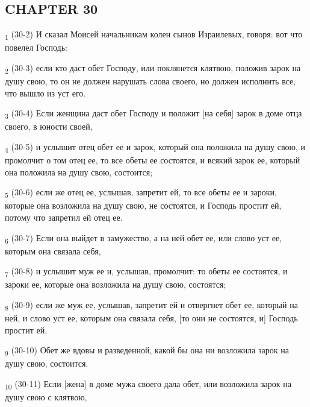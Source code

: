 \subsection{CHAPTER 30}
\begin{tcolorbox}
\textsubscript{1} (30-2) И сказал Моисей начальникам колен сынов Израилевых, говоря: вот что повелел Господь:
\end{tcolorbox}
\begin{tcolorbox}
\textsubscript{2} (30-3) если кто даст обет Господу, или поклянется клятвою, положив зарок на душу свою, то он не должен нарушать слова своего, но должен исполнить все, что вышло из уст его.
\end{tcolorbox}
\begin{tcolorbox}
\textsubscript{3} (30-4) Если женщина даст обет Господу и положит [на себя] зарок в доме отца своего, в юности своей,
\end{tcolorbox}
\begin{tcolorbox}
\textsubscript{4} (30-5) и услышит отец обет ее и зарок, который она положила на душу свою, и промолчит о том отец ее, то все обеты ее состоятся, и всякий зарок ее, который она положила на душу свою, состоится;
\end{tcolorbox}
\begin{tcolorbox}
\textsubscript{5} (30-6) если же отец ее, услышав, запретит ей, то все обеты ее и зароки, которые она возложила на душу свою, не состоятся, и Господь простит ей, потому что запретил ей отец ее.
\end{tcolorbox}
\begin{tcolorbox}
\textsubscript{6} (30-7) Если она выйдет в замужество, а на ней обет ее, или слово уст ее, которым она связала себя,
\end{tcolorbox}
\begin{tcolorbox}
\textsubscript{7} (30-8) и услышит муж ее и, услышав, промолчит: то обеты ее состоятся, и зароки ее, которые она возложила на душу свою, состоятся;
\end{tcolorbox}
\begin{tcolorbox}
\textsubscript{8} (30-9) если же муж ее, услышав, запретит ей и отвергнет обет ее, который на ней, и слово уст ее, которым она связала себя, [то они не состоятся, и] Господь простит ей.
\end{tcolorbox}
\begin{tcolorbox}
\textsubscript{9} (30-10) Обет же вдовы и разведенной, какой бы она ни возложила зарок на душу свою, состоится.
\end{tcolorbox}
\begin{tcolorbox}
\textsubscript{10} (30-11) Если [жена] в доме мужа своего дала обет, или возложила зарок на душу свою с клятвою,
\end{tcolorbox}
